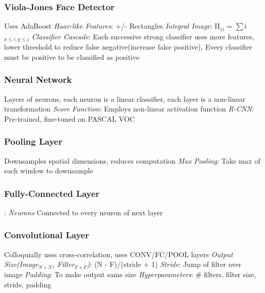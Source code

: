 \documentclass{article}
\begin{document}
\begin{multicols*}{2}
        \subsubsection*{Viola-Jones Face Detector}
        Uses AdaBoost\newline
        \textit{Haar-like Features}: +/- Rectangles\newline
        \textit{Integral Image}: II$_{ij}$ = $\sum$i$_{x\leq i;y \leq j}$ \newline
        \textit{Classifier Cascade}: Each successive strong classifier uses more features, lower
        threshold to reduce false negative(increase false positive), Every classifier must be
        positive to be classified as positive
        \subsubsection*{Neural Network}
        Layers of neurons, each neuron is a linear classifier, each layer is a non-linear
        transformation\newline
        \textit{Score Function}: Employs non-linear activation function\newline
        \textit{R-CNN}: Pre-trained, fine-tuned on PASCAL VOC
        \subsubsection*{Pooling Layer}
        Downsamples spatial dimensions, reduces computation\newline
        \textit{Max Pooling}: Take max of each window to downsample
        \subsubsection*{Fully-Connected Layer}:
        \textit{Neurons} Connected to every neuron of next layer
        \subsubsection*{Convolutional Layer}
        Colloquially uses cross-correlation, uses CONV/FC/POOL layers\newline
        \textit{Output Size(Image$_{N\times N}$, Filter$_{F \times F}$)}: (N - F)/(stride + 1)\newline
        \textit{Stride}: Jump of filter over image\newline
        \textit{Padding}: To make output same size\newline
        \textit{Hyperparameters}: \# filters, filter size, stride, padding

\end{multicols*}
\end{document}
